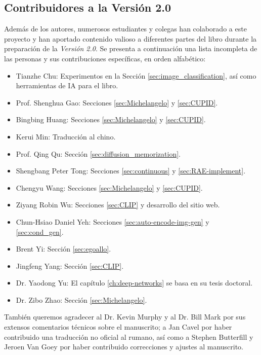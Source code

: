 \documentclass[../../book-main_es.tex]{subfiles}
\begin{document}
\subsection*{Contribuidores a la Versión 2.0}
Además de los autores, numerosos estudiantes y colegas han colaborado a este proyecto y han aportado contenido valioso a diferentes partes del libro durante la preparación de la {\em Versión 2.0}. Se presenta a continuación una lista incompleta de las personas y sus contribuciones específicas, en orden alfabético:
\begin{itemize}
    \item Tianzhe Chu: Experimentos en la Sección \ref{sec:image_classification}, así como herramientas de IA para el libro.
    \item Prof. Shenghua Gao: Secciones \ref{sec:Michelangelo} y \ref{sec:CUPID}.
    \item Bingbing Huang: Secciones \ref{sec:Michelangelo} y \ref{sec:CUPID}.
    \item Kerui Min: Traducción al chino.
    \item Prof. Qing Qu: Sección \ref{sec:diffusion_memorization}.
    \item Shengbang Peter Tong: Secciones \ref{sec:continuous} y \ref{sec:RAE-implement}.
    \item Chengyu Wang: Secciones \ref{sec:Michelangelo} y \ref{sec:CUPID}.
    \item Ziyang Robin Wu: Secciones \ref{sec:CLIP} y desarrollo del sitio web.
    \item Chun-Hsiao Daniel Yeh: Secciones \ref{sec:auto-encode-img-gen} y \ref{sec:cond_gen}.
    \item Brent Yi: Sección \ref{sec:egoallo}.
    \item Jingfeng Yang: Sección \ref{sec:CLIP}.
    \item Dr. Yaodong Yu: El capítulo \ref{ch:deep-networks} se basa en su tesis doctoral.
    \item Dr. Zibo Zhao: Sección \ref{sec:Michelangelo}.
\end{itemize}
También queremos agradecer al Dr. Kevin Murphy y al Dr. Bill Mark por sus extensos comentarios técnicos 
sobre el manuscrito; a Jan Cavel por haber contribuido una traducción no oficial al rumano, así como a 
Stephen Butterfill y Jeroen Van Goey por haber contribuido correcciones y ajustes al manuscrito.
\end{document}
